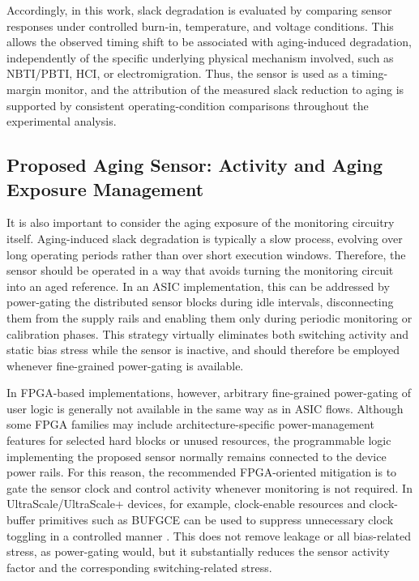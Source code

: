 \documentclass[a4paper,10pt,twoside,twocolumn,final]{JICS_LaTexGuidelines}
\begin{document}
Accordingly, in this work, slack degradation is evaluated by comparing sensor responses under controlled burn-in, temperature, and voltage conditions. This allows the observed timing shift to be associated with aging-induced degradation, independently of the specific underlying physical mechanism involved, such as NBTI/PBTI, HCI, or electromigration. Thus, the sensor is used as a timing-margin monitor, and the attribution of the measured slack reduction to aging is supported by consistent operating-condition comparisons throughout the experimental analysis.


\subsection{Proposed Aging Sensor: Activity and Aging Exposure Management}
\label{sec:sensor_activity_aging}

It is also important to consider the aging exposure of the monitoring circuitry itself. Aging-induced slack degradation is typically a slow process, evolving over long operating periods rather than over short execution windows. Therefore, the sensor should be operated in a way that avoids turning the monitoring circuit into an aged reference. In an ASIC implementation, this can be addressed by power-gating the distributed sensor blocks during idle intervals, disconnecting them from the supply rails and enabling them only during periodic monitoring or calibration phases. This strategy virtually eliminates both switching activity and static bias stress while the sensor is inactive, and should therefore be employed whenever fine-grained power-gating is available.

In FPGA-based implementations, however, arbitrary fine-grained power-gating of user logic is generally not available in the same way as in ASIC flows. Although some FPGA families may include architecture-specific power-management features for selected hard blocks or unused resources, the programmable logic implementing the proposed sensor normally remains connected to the device power rails. For this reason, the recommended FPGA-oriented mitigation is to gate the sensor clock and control activity whenever monitoring is not required. In UltraScale/UltraScale+ devices, for example, clock-enable resources and clock-buffer primitives such as BUFGCE can be used to suppress unnecessary clock toggling in a controlled manner \cite{AMD_UG572_UltraScaleClocking_2025}. This does not remove leakage or all bias-related stress, as power-gating would, but it substantially reduces the sensor activity factor and the corresponding switching-related stress.
\end{document}
